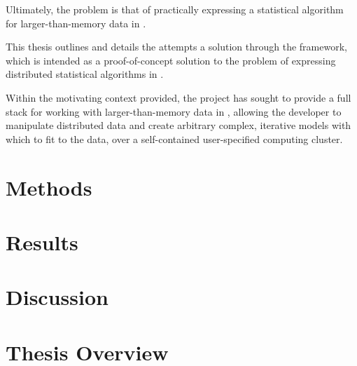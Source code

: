 Ultimately, the problem is that of practically expressing a statistical algorithm for larger-than-memory data in \R{}.

This thesis outlines and details the attempts a solution through the \lsr{} framework, which is intended as a proof-of-concept solution to the problem of expressing distributed statistical algorithms in \R{}.

Within the motivating context provided, the \lsr{} project has sought to provide a full stack for working with larger-than-memory data in \R{}, allowing the developer to manipulate distributed data and create arbitrary complex, iterative models with which to fit to the data, over a self-contained user-specified computing cluster.

\section{Methods}\label{sec:methods}

\section{Results}\label{sec:results}

\section{Discussion}\label{sec:discussion}

\section{Thesis Overview}\label{sec:intro-overview}


